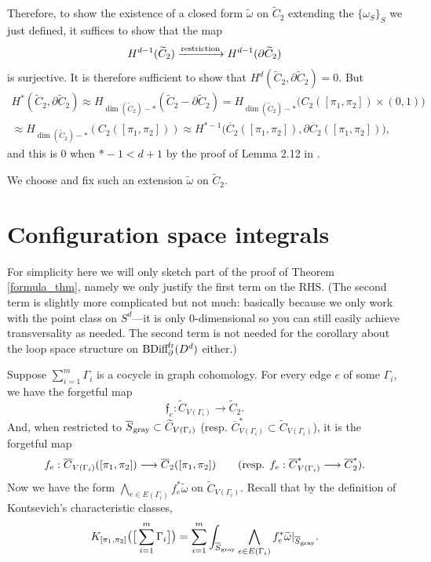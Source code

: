 \documentclass[11pt]{article}
\theoremstyle{definition}
\theoremstyle{remark}
\def\wt#1{\widetilde{#1}}
\def\ov#1{\overline{#1}}
\def\sgray{{\textnormal{gray}}}
\def\ff{\mathfrak{f}}
\def\tn#1{\textnormal{#1}}
\begin{document}
Therefore, to show the existence of a closed form $\wt{\omega}$ on $\wt{C}_2$ extending the $\{\omega_S\}_S$ we just defined, 
it suffices to show that the map 
$$H^{d-1}(\wt{C}_2)\xrightarrow{\tn{restriction}}H^{d-1}(\partial\wt{C}_2)$$
is surjective. 
It is therefore sufficient to show that $H^d(\wt{C}_2,\partial\wt{C}_2)=0$. But 
\begin{align*}
H^*(\wt{C}_2,\partial\wt{C}_2)\approx
H_{\dim(\wt{C}_2)-*}(\wt{C}_2-\partial\wt{C}_2)=
H_{\dim(\wt{C}_2)-*}\big(C_2([\pi_1,\pi_2])\times (0,1)\big)\\
\approx
H_{\dim(\wt{C}_2)-*}({C}_2([\pi_1,\pi_2]))
\approx H^{*-1}\big(\ov{C}_2([\pi_1,\pi_2]),\partial\ov{C}_2([\pi_1,\pi_2])\big), 
\end{align*}
and this is 0 when $*-1<d+1$ by the proof of Lemma 2.12 in \cite{WatanabeAddendum}. 

We choose and fix such an extension $\wt\omega$ on $\wt{C}_2$. 

\section{Configuration space integrals}

For simplicity here we will only sketch part of the proof of Theorem \ref{formula_thm}, namely we only justify the first term on the RHS. 
(The second term is slightly more complicated but not much: basically because we only work with the point class on $S^d$---it is only 0-dimensional so you can still easily achieve transversality as needed. The second term is not needed for the corollary about the loop space structure on $\tn{BDiff}^{\tn{fr}}_\partial(D^d)$ either.) 

Suppose $\sum_{i=1}^{m}\Gamma_i$ is a cocycle in graph cohomology. 
For every edge $e$ of some $\Gamma_i$, we have the forgetful map 
$$\ff_e:\wt{C}_{V(\Gamma_i)}\longrightarrow\wt{C}_2.$$
And, when restricted to $\ov{S}_{\sgray}\subset\wt{C}_{V(\Gamma_i)}$ (resp. $\ov{C}_{V(\Gamma_i)}^*\subset\wt{C}_{V(\Gamma_i)}$), it is the forgetful map
$$f_e:\ov{C}_{V(\Gamma_i)}([\pi_1,\pi_2])\longrightarrow\ov{C}_2([\pi_1,\pi_2]) \qquad (\tn{resp. } f_e:\ov{C}^*_{V(\Gamma_i)}\longrightarrow\ov{C}^*_2).$$
Now we have the form $\bigwedge_{e\in E(\Gamma_i)}f_e^*\wt{\omega}$ on $\wt{C}_{V(\Gamma_i)}$. 
Recall that by the definition of Kontsevich's characteristic classes, 
$$K_{[\pi_1,\pi_2]}\big(\big[\sum_{i=1}^m\Gamma_i\big]\big)=\sum_{i=1}^m\int_{\ov{S}_{\sgray}}\bigwedge_{e\in E(\Gamma_i)}f_e^*\wt{\omega}|_{\ov{S}_{\sgray}}.$$
\end{document}
